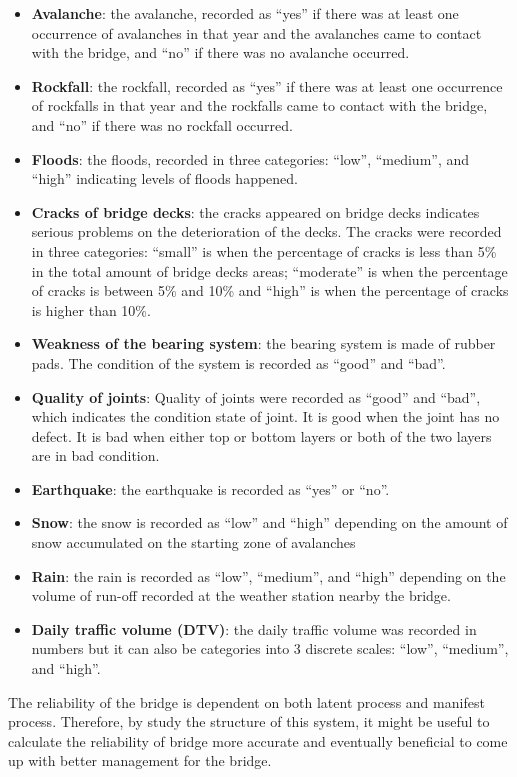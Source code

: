 \begin{itemize}
 \item \textbf{Avalanche}: the avalanche, recorded as ``yes'' if there was at least one occurrence of avalanches in that year and the avalanches came to contact with the bridge, and ``no'' if there was no avalanche occurred. 
 \item \textbf{Rockfall}: the rockfall, recorded as ``yes'' if there was at least one occurrence of rockfalls in that year and the rockfalls came to contact with the bridge, and ``no'' if there was no rockfall occurred. 
 \item \textbf{Floods}: the floods, recorded in three categories: ``low'', ``medium'', and ``high'' indicating levels of floods happened.
 \item \textbf{Cracks of bridge decks}: the cracks appeared on bridge decks indicates serious problems on the deterioration of the decks. The cracks were recorded in three categories: ``small'' is when the percentage of cracks is less than 5\% in the total amount of bridge decks areas; ``moderate'' is when the percentage of cracks is between 5\% and 10\% and ``high'' is when the percentage of cracks is higher than 10\%.
 \item \textbf{Weakness of the bearing system}: the bearing system is made of rubber pads. The condition of the system is recorded as ``good'' and ``bad''.
 \item \textbf{Quality of joints}: Quality of joints were recorded as ``good'' and ``bad'', which indicates the condition state of joint. It is good when the joint has no defect. It is bad when either top or bottom layers or both of the two layers are in bad condition.
 \item \textbf{Earthquake}: the earthquake is recorded as ``yes'' or ``no''.
 \item \textbf{Snow}: the snow is recorded as ``low'' and ``high'' depending on the amount of snow accumulated on the starting zone of avalanches
 \item \textbf{Rain}: the rain is recorded as ``low'', ``medium'', and ``high'' depending on the volume of run-off recorded at the weather station nearby the bridge.
 \item \textbf{Daily traffic volume (DTV)}: the daily traffic volume was recorded in numbers but it can also be categories into 3 discrete scales: ``low'', ``medium'', and ``high''.
\end{itemize}

The reliability of the bridge is dependent on both latent process and manifest process. Therefore, by study the structure of this system, it might be useful to calculate the reliability of bridge more accurate and eventually beneficial to come up with better management for the bridge.


